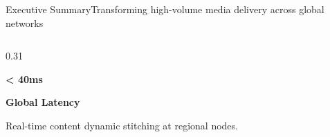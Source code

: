 \documentclass[aspectratio=169,11pt]{beamer}
\begin{document}
\begin{frame}{Executive Summary}{Transforming high-volume media delivery across global networks}
\begin{columns}[T]
    \begin{column}{0.31\textwidth}
      \begin{tcolorbox}[accentcard]
        \begin{center}
          {\huge\bfseries\color{accentcyan} < 40ms} \par
          \vspace{2pt}
          {\small\bfseries Global Latency} \par
          \vspace{2pt}
          {\tiny\color{textmuted} Real-time content dynamic stitching at regional nodes.}
        \end{center}
      \end{tcolorbox}
    \end{column}
  \end{columns}
\end{frame}
\end{document}

